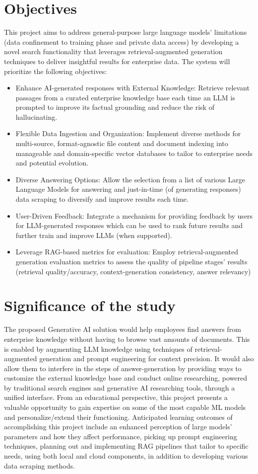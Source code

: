 \section{Objectives}
This project aims to address general-purpose large language models' limitations (data confinement to training phase and private data access) by developing a novel search functionality that leverages retrieval-augmented generation techniques to deliver insightful results for enterprise data. The system will prioritize the following objectives:
\begin{itemize}
    \item Enhance AI-generated responses with External Knowledge: Retrieve relevant passages from a curated enterprise knowledge base each time an LLM is prompted to improve its factual grounding and reduce the risk of hallucinating.
    \item Flexible Data Ingestion and Organization: Implement diverse methods for multi-source, format-agnostic file content and document indexing into manageable and domain-specific vector databases to tailor to enterprise needs and potential evolution.
    \item Diverse Answering Options: Allow the selection from a list of various Large Language Models for answering and just-in-time (of generating responses) data scraping to diversify and improve results each time.
    \item User-Driven Feedback: Integrate a mechanism for providing feedback by users for LLM-generated responses which can be used to rank future results and further train and improve LLMs (when supported).
    \item Leverage RAG-based metrics for evaluation: Employ retrieval-augmented generation evaluation metrics to assess the quality of pipeline stages' results (retrieval quality/accuracy, context-generation consistency, answer relevancy)
\end{itemize}
\newpage
\section{Significance of the study}
The proposed Generative AI solution would help employees find answers from enterprise knowledge without having to browse vast amounts of documents. This is enabled by augmenting LLM knowledge using techniques of retrieval-augmented generation and prompt engineering for context precision. It would also allow them to interfere in the steps of answer-generation by providing ways to customize the external knowledge base and conduct online researching, powered by traditional search engines and generative AI researching tools, through a unified interface.\medskip\newline
From an educational perspective, this project presents a valuable opportunity to gain expertise on some of the most capable ML models and personalize/extend their functioning. Anticipated learning outcomes of accomplishing this project include an enhanced perception of large models' parameters and how they affect performance, picking up prompt engineering techniques, planning out and implementing RAG pipelines that tailor to specific needs, using both local and cloud components, in addition to developing various data scraping methods.